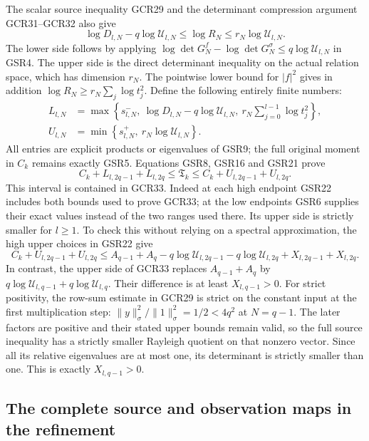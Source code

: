 \documentclass[11pt,a4paper]{article}
\begin{document}
The scalar source inequality GCR29 and the determinant
compression argument GCR31--GCR32 also give
\[
 \log D_{l,N}-q\log\mathscr U_{l,N}
    \leq\log R_N\leq r_N\log\mathscr U_{l,N}.
\tag{GSR21}
\]
The lower side follows by applying
$\log\det G_N^f-\log\det G_N^\sigma\leq
q\log\mathscr U_{l,N}$ in GSR4.
The upper side is the direct determinant inequality on the
actual relation space, which has dimension $r_N$.
The pointwise lower bound for $|f|^2$ gives in addition
$\log R_N\geq r_N\sum_j\log t_j^2$.
Define the following entirely finite numbers:
\[
\begin{split}
 L_{l,N}
 &=\max\left\{s^-_{l,N},\
     \log D_{l,N}-q\log\mathscr U_{l,N},\
                       r_N\sum_{j=0}^{l-1}\log t_j^2\right\},\\
 U_{l,N}
 &=\min\left\{s^+_{l,N},\
                         r_N\log\mathscr U_{l,N}\right\}.
\end{split}\tag{GSR22}
\]
All entries are explicit products or eigenvalues of GSR9;
the full original moment in $C_k$ remains exactly GSR5.
Equations GSR8, GSR16 and GSR21 prove
\[
 \boxed{\quad
 C_k+L_{l,2q-1}+L_{l,2q}
       \leq\mathfrak T_k
       \leq C_k+U_{l,2q-1}+U_{l,2q}.
 \quad}\tag{GSR23}
\]
This interval is contained in GCR33. Indeed at each high
endpoint GSR22 includes both bounds used to prove GCR33;
at the low endpoints GSR6 supplies their exact values instead
of the two ranges used there.
Its upper side is strictly smaller for $l\geq1$.
To check this without relying on a spectral approximation,
the high upper choices in GSR22 give
\[
 C_k+U_{l,2q-1}+U_{l,2q}
 \leq A_{q-1}+A_q
       -q\log\mathscr U_{l,2q-1}
       -q\log\mathscr U_{l,2q}
       +X_{l,2q-1}+X_{l,2q}.
\]
In contrast, the upper side of GCR33 replaces
$A_{q-1}+A_q$ by
$q\log\mathscr U_{l,q-1}+q\log\mathscr U_{l,q}$.
Their difference is at least $X_{l,q-1}>0$.
For strict positivity, the row-sum estimate in GCR29 is strict
on the constant input at the first multiplication step:
$\|y\|_\sigma^2/\|1\|_\sigma^2=1/2<4q^2$ at $N=q-1$.
The later factors are positive and their stated upper bounds
remain valid, so the full source inequality has a strictly
smaller Rayleigh quotient on that nonzero vector.
Since all its relative eigenvalues are at most one, its
determinant is strictly smaller than one. This is exactly
$X_{l,q-1}>0$.

\subsection{The complete source and observation maps in the refinement}
\end{document}
